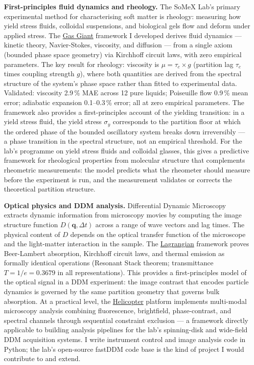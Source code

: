 \documentclass[12pt,a4paper]{article}
\begin{document}
\textbf{First-principles fluid dynamics and rheology.}
The SoMeX Lab's primary experimental method for characterising soft matter
is rheology: measuring how yield stress fluids, colloidal suspensions, and
biological gels flow and deform under applied stress.
The \href{https://gas-giant.vercel.app/simulate}{Gas Giant} framework I
developed derives fluid dynamics --- kinetic theory, Navier-Stokes, viscosity,
and diffusion --- from a single axiom (bounded phase space geometry) via
Kirchhoff circuit laws, with zero empirical parameters.
The key result for rheology:
viscosity is $\mu = \tau_c \times g$ (partition lag $\tau_c$ times coupling
strength $g$), where both quantities are derived from the spectral structure
of the system's phase space rather than fitted to experimental data.
Validated: viscosity 2.9\,\% MAE across 12 pure liquids; Poiseuille flow
0.9\,\% mean error; adiabatic expansion 0.1--0.3\,\% error; all at zero
empirical parameters.
The framework also provides a first-principles account of the yielding
transition: in a yield stress fluid, the yield stress $\sigma_y$ corresponds
to the partition floor at which the ordered phase of the bounded oscillatory
system breaks down irreversibly --- a phase transition in the spectral structure,
not an empirical threshold.
For the lab's programme on yield stress fluids and colloidal glasses, this
gives a predictive framework for rheological properties from molecular structure
that complements rheometric measurements: the model predicts what the rheometer
should measure before the experiment is run, and the measurement validates or
corrects the theoretical partition structure.

\textbf{Optical physics and DDM analysis.}
Differential Dynamic Microscopy extracts dynamic information from microscopy
movies by computing the image structure function $D(\mathbf{q}, \Delta t)$
across a range of wave vectors and lag times. The physical content of $D$
depends on the optical transfer function of the microscope and the light-matter
interaction in the sample.
The \href{https://github.com/fullscreen-triangle/lagrangian}{Lagrangian}
framework proves Beer-Lambert absorption, Kirchhoff circuit laws, and thermal
emission as formally identical operations (Resonant Stack theorem;
transmittance $T = 1/e = 0.3679$ in all representations). This provides a
first-principles model of the optical signal in a DDM experiment: the image
contrast that encodes particle dynamics is governed by the same partition
geometry that governs bulk absorption.
At a practical level, the \href{https://github.com/fullscreen-triangle/helicopter}{Helicopter}
platform implements multi-modal microscopy analysis combining fluorescence,
brightfield, phase-contrast, and spectral channels through sequential
constraint exclusion --- a framework directly applicable to building analysis
pipelines for the lab's spinning-disk and wide-field DDM acquisition systems.
I write instrument control and image analysis code in Python; the lab's
open-source fastDDM code base is the kind of project I would contribute to
and extend.
\end{document}
